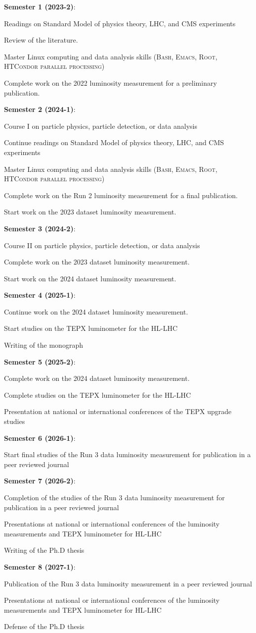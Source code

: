 \documentclass[final,12p]{article}
\newcommand{\SubItem}[1]{ {\setlength\itemindent{15pt} \item[-] #1} }
\begin{document}
\begin{itemize}

\item {\bf Semester 1 (2023-2)}:
  \SubItem{ Readings on Standard Model of physics theory, LHC, and CMS experiments}
  \SubItem{ Review of the literature.}
  \SubItem{ Master Linux computing and data analysis  skills (\textsc{Bash, Emacs, Root, HTCondor parallel processing})}
  \SubItem{ Complete work on the 2022 luminosity measurement for a preliminary  publication.}

\item {\bf Semester 2 (2024-1)}:
  \SubItem{ Course I on particle physics, particle detection, or data analysis}
  \SubItem{ Continue readings on Standard Model of physics theory, LHC, and CMS experiments}
  \SubItem{ Master Linux computing and data analysis  skills (\textsc{Bash, Emacs, Root, HTCondor parallel processing})}
  \SubItem{ Complete work on the Run 2 luminosity measurement for a final  publication.}
  \SubItem{ Start work on the 2023 dataset luminosity measurement. }
  
\item {\bf Semester 3 (2024-2)}:
  \SubItem{ Course II on particle physics, particle detection, or  data analysis}
  \SubItem{ Complete work on the 2023 dataset luminosity measurement. }
  \SubItem{ Start work on the 2024 dataset luminosity measurement. }
  
\item {\bf Semester 4 (2025-1)}:
  \SubItem{ Continue work on the 2024 dataset luminosity measurement. }
  \SubItem{ Start studies on the TEPX luminometer for the HL-LHC}
  \SubItem{ Writing of the monograph}

\item {\bf Semester 5 (2025-2)}:
  \SubItem{ Complete work on the 2024 dataset luminosity measurement. }
  \SubItem{ Complete studies on the TEPX luminometer for the HL-LHC}
  \SubItem{ Presentation at national or international conferences of the TEPX upgrade studies}
  
\item {\bf Semester 6 (2026-1)}:
  \SubItem{ Start final studies of the Run 3 data luminosity measurement for publication in a peer reviewed journal}

\item {\bf Semester 7 (2026-2)}:
  \SubItem{ Completion of the studies of the Run 3 data luminosity measurement for publication in a peer reviewed journal}
  \SubItem{ Presentations at national or international conferences of the luminosity measurements and TEPX luminometer for HL-LHC}
  \SubItem{ Writing of the Ph.D thesis}
  
\item {\bf Semester 8 (2027-1)}: 
  \SubItem{ Publication of the Run 3 data luminosity measurement in a peer reviewed journal}
  \SubItem{ Presentations at national or international conferences of the luminosity measurements and TEPX luminometer for HL-LHC}
  \SubItem{ Defense of the Ph.D thesis}
  
\end{itemize}


\onehalfspacing


\end{document}

